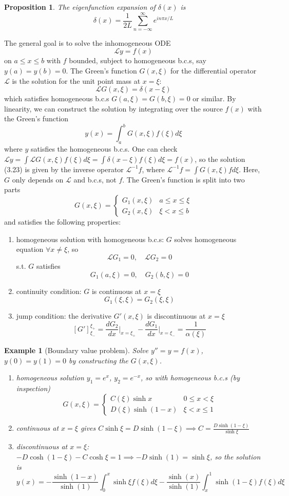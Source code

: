 \documentclass[a4paper]{article}
\newtheorem{eg}{Example}[section]
\theoremstyle{new}
\newtheorem{prop}{Proposition}[section]
\begin{document}
\begin{prop}
The eigenfunction expansion of $\delta(x)$ is 
$$\delta(x)=\frac{1}{2L}\sum_{n=-\infty}^\infty e^{in\pi x/L}$$
\end{prop}
The general goal is to solve the inhomogeneous ODE
$$\mathcal{L}y=f(x)$$
on $a\leq x\leq b$ with $f$ bounded, subject to homogeneous b.c.s, say $y(a)=y(b)=0$. The Green's function $G(x,\xi)$ for the differential operator $\mathcal{L}$ is the solution for the unit point mass at $x=\xi$:
$$\mathcal{L}G(x,\xi)=\delta(x-\xi)$$
which satisfies homogeneous b.c.s $G(a,\xi)=G(b,\xi)=0$ or similar. By linearity, we can construct the solution by integrating over the source $f(x)$ with the Green's function
$$y(x)=\int_a^bG(x,\xi)f(\xi)d\xi$$
where $y$ satisfies the homogeneous b.c.s. One can check
$\mathcal{L}y=\int\mathcal{L}G(x,\xi)f(\xi)d\xi=\int\delta(x-\xi)f(\xi)d\xi=f(x)$, so the solution (3.23) is given by the inverse operator $\mathcal{L}^{-1}f$, where $\mathcal{L}^{-1}f=\int G(x,\xi)fd\xi$. Here, $G$ only depends on $\mathcal{L}$ and b.c.s, not $f$. The Green's function is split into two parts
$$ G(x,\xi)=
\left\{
        \begin{array}{ll}
      G_1(x,\xi) & a\leq x\leq\xi\\
      G_2(x,\xi) & \xi<x\leq b
        \end{array}
    \right.$$
and satisfies the following properties:
\begin{enumerate}
    \item homogeneous solution with homogeneous b.c.s: $G$ solves homogeneous equation $\forall x\neq\xi$, so
$$\mathcal{L}G_1=0,\quad\mathcal{L}G_2=0$$
    s.t. $G$ satisfies
$$ G_1(a,\xi)=0,\quad G_2(b,\xi)=0$$
    \item continuity condition: $G$ is continuous at $x=\xi$
$$ G_1(\xi,\xi)=G_2(\xi,\xi)$$
    \item jump condition: the derivative $G'(x,\xi)$ is discontinuous at $x=\xi$
$$[G']_{\xi_-}^{\xi_+}=\frac{dG_2}{dx}\bigg|_{x=\xi_+}-\frac{dG_1}{dx}\bigg|_{x=\xi_-}=\frac{1}{\alpha(\xi)}$$
\end{enumerate}
\begin{eg}[Boundary value problem]
Solve $y''=y=f(x)$, $y(0)=y(1)=0$ by constructing the $G(x,\xi)$. 
\begin{enumerate}
    \item homogeneous solution $y_1=e^x$, $y_2=e^{-x}$, so with homogeneous b.c.s (by inspection)
$$
  G(x,\xi)=\left\{
        \begin{array}{ll}
      C(\xi)\sinh x& 0\leq x<\xi\\
      D(\xi)\sinh(1-x) & \xi<x\leq 1
        \end{array}\right.$$
        \item continuous at $x=\xi$ gives  $    C\sinh\xi=D\sinh(1-\xi)\implies C=\frac{D\sinh(1-\xi)}{\sinh\xi}$
        \item discontinuous at $x=\xi$: $-D\cosh(1-\xi)-C\cosh\xi=1\implies -D\sinh(1)=\sinh\xi$, 
so the solution is
$$
y(x)=-\frac{\sinh(1-x)}{\sinh(1)}\int_0^x\sinh\xi f(\xi)d\xi-\frac{\sinh(x)}{\sinh(1)}\int_x^1\sinh(1-\xi)f(\xi)d\xi$$
\end{enumerate}
\end{eg}
\end{document}

